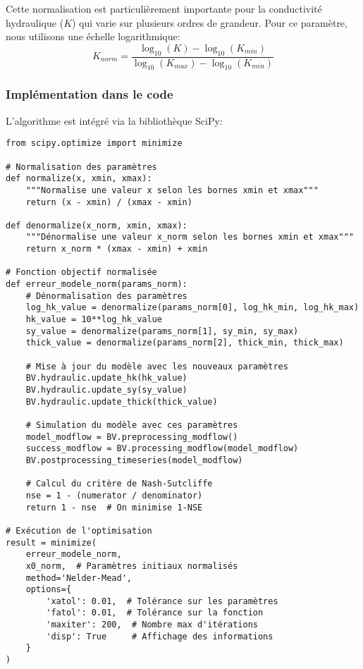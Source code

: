 Cette normalisation est particulièrement importante pour la conductivité hydraulique ($K$) qui varie sur plusieurs ordres de grandeur. Pour ce paramètre, nous utilisons une échelle logarithmique:
\begin{equation}
K_{norm} = \frac{\log_{10}(K) - \log_{10}(K_{min})}{\log_{10}(K_{max}) - \log_{10}(K_{min})}
\end{equation}

\subsubsection{Implémentation dans le code}

L'algorithme est intégré via la bibliothèque SciPy:

\begin{verbatim}
from scipy.optimize import minimize

# Normalisation des paramètres
def normalize(x, xmin, xmax):
    """Normalise une valeur x selon les bornes xmin et xmax"""
    return (x - xmin) / (xmax - xmin)

def denormalize(x_norm, xmin, xmax):
    """Dénormalise une valeur x_norm selon les bornes xmin et xmax"""
    return x_norm * (xmax - xmin) + xmin

# Fonction objectif normalisée
def erreur_modele_norm(params_norm):
    # Dénormalisation des paramètres
    log_hk_value = denormalize(params_norm[0], log_hk_min, log_hk_max)
    hk_value = 10**log_hk_value
    sy_value = denormalize(params_norm[1], sy_min, sy_max)
    thick_value = denormalize(params_norm[2], thick_min, thick_max)
    
    # Mise à jour du modèle avec les nouveaux paramètres
    BV.hydraulic.update_hk(hk_value)
    BV.hydraulic.update_sy(sy_value)
    BV.hydraulic.update_thick(thick_value)
    
    # Simulation du modèle avec ces paramètres
    model_modflow = BV.preprocessing_modflow()
    success_modflow = BV.processing_modflow(model_modflow)
    BV.postprocessing_timeseries(model_modflow)
    
    # Calcul du critère de Nash-Sutcliffe
    nse = 1 - (numerator / denominator) 
    return 1 - nse  # On minimise 1-NSE

# Exécution de l'optimisation
result = minimize(
    erreur_modele_norm, 
    x0_norm,  # Paramètres initiaux normalisés
    method='Nelder-Mead',
    options={
        'xatol': 0.01,  # Tolérance sur les paramètres
        'fatol': 0.01,  # Tolérance sur la fonction
        'maxiter': 200,  # Nombre max d'itérations
        'disp': True     # Affichage des informations
    }
)
\end{verbatim}

